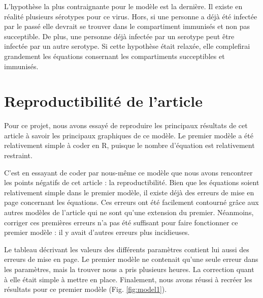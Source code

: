 \documentclass[
  12pt,
  french,
  oneside]{article}
\begin{document}
L'hypothèse la plus contraignante pour le modèle est la dernière. Il
existe en réalité plusieurs sérotypes pour ce virus. Hors, si une
personne a déjà été infectée par le passé elle devrait se trouver dans
le compartiment immunisés et non pas succeptible. De plus, une personne
déjà infectée par un serotype peut être infectée par un autre serotype.
Si cette hypothèse était relaxée, elle complefirai grandement les
équations consernant les compartiments succeptibles et immunisés.

\hypertarget{reproductibilituxe9-de-larticle}{%
\section{Reproductibilité de
l'article}\label{reproductibilituxe9-de-larticle}}

Pour ce projet, nous avons essayé de reproduire les principaux résultats
de cet article à savoir les principaux graphiques de ce modèle. Le
premier modèle a été relativement simple à coder en R, puisque le nombre
d'équation est relativement restraint.

C'est en essayant de coder par nous-même ce modèle que nous avons
rencontrer les points négatifs de cet article : la reproductibilité.
Bien que les équations soient relativement simple dans le premier
modèle, il existe déjà des erreurs de mise en page concernant les
équations. Ces erreurs ont été facilement contourné grâce aux autres
modèles de l'article qui ne sont qu'une extension du premier. Néanmoins,
corriger ces premières erreurs n'a pas été suffisant pour faire
fonctionner ce premier modèle : il y avait d'autres erreurs plus
incidieuses.

Le tableau décrivant les valeurs des différents paramètres contient lui
aussi des erreurs de mise en page. Le premier modèle ne contenait qu'une
seule erreur dans les paramètres, mais la trouver nous a pris plusieurs
heures. La correction quant à elle était simple à mettre en place.
Finalement, nous avons réussi à recréer les résultats pour ce premier
modèle (Fig. \ref{fig:model1}).
\end{document}
